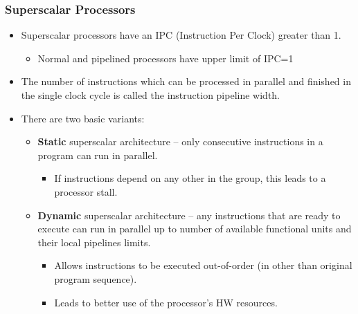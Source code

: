 \documentclass{beamer}
\begin{document}
\begin{frame}
\frametitle{Superscalar Processors}

\begin{itemize}
\item Superscalar processors have an IPC (Instruction Per Clock) greater than 1.
  \begin{itemize}
  \item Normal and pipelined processors have upper limit of IPC=1
  \end{itemize}
\item The number of instructions which can be processed in parallel and finished in the single clock cycle is called the instruction pipeline width.
\item There are two basic variants:
  \begin{itemize}
  \item \textbf{Static} superscalar architecture -- only consecutive instructions in a program can run in parallel.
    \begin{itemize}
    \item If instructions depend on any other in the group, this leads to a processor stall.
    \end{itemize}
  \item \textbf{Dynamic} superscalar architecture -- any instructions that are ready to execute can run in parallel up to number of available functional units and their local pipelines limits.
    \begin{itemize}
    \item Allows instructions to be executed out-of-order (in other than original program sequence).
    \item Leads to better use of the processor's HW resources.
    \end{itemize}
  \end{itemize}
\end{itemize}

\end{frame}
\end{document}
